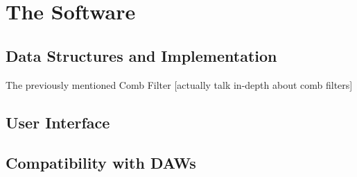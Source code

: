 \chapter{The Software}

\section{Data Structures and Implementation}
The previously mentioned Comb Filter [actually talk in-depth about comb filters]

\section{User Interface}

\section{Compatibility with DAWs}
